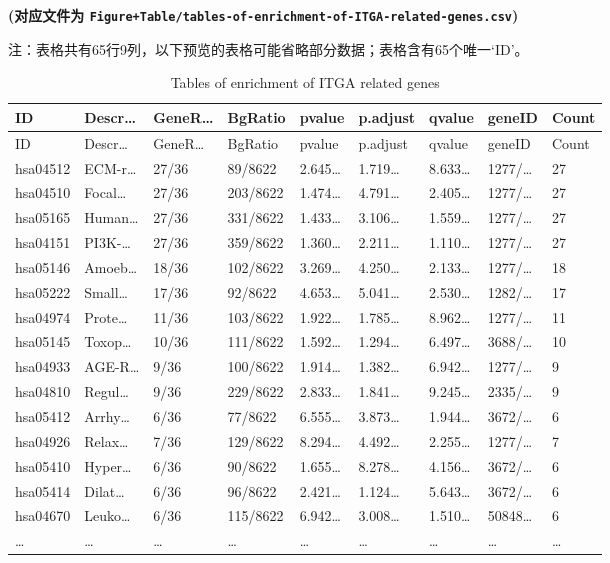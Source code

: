 \documentclass[
]{article}
\begin{document}
\textbf{(对应文件为 \texttt{Figure+Table/tables-of-enrichment-of-ITGA-related-genes.csv})}

\begin{center}\begin{tcolorbox}[colback=gray!10, colframe=gray!50, width=0.9\linewidth, arc=1mm, boxrule=0.5pt]注：表格共有65行9列，以下预览的表格可能省略部分数据；表格含有65个唯一`ID'。
\end{tcolorbox}
\end{center}

\begin{longtable}[]{@{}lllllllll@{}}
\caption{\label{tab:tables-of-enrichment-of-ITGA-related-genes}Tables of enrichment of ITGA related genes}\tabularnewline
\toprule
ID & Descr\ldots{} & GeneR\ldots{} & BgRatio & pvalue & p.adjust & qvalue & geneID & Count\tabularnewline
\midrule
\endfirsthead
\toprule
ID & Descr\ldots{} & GeneR\ldots{} & BgRatio & pvalue & p.adjust & qvalue & geneID & Count\tabularnewline
\midrule
\endhead
hsa04512 & ECM-r\ldots{} & 27/36 & 89/8622 & 2.645\ldots{} & 1.719\ldots{} & 8.633\ldots{} & 1277/\ldots{} & 27\tabularnewline
hsa04510 & Focal\ldots{} & 27/36 & 203/8622 & 1.474\ldots{} & 4.791\ldots{} & 2.405\ldots{} & 1277/\ldots{} & 27\tabularnewline
hsa05165 & Human\ldots{} & 27/36 & 331/8622 & 1.433\ldots{} & 3.106\ldots{} & 1.559\ldots{} & 1277/\ldots{} & 27\tabularnewline
hsa04151 & PI3K-\ldots{} & 27/36 & 359/8622 & 1.360\ldots{} & 2.211\ldots{} & 1.110\ldots{} & 1277/\ldots{} & 27\tabularnewline
hsa05146 & Amoeb\ldots{} & 18/36 & 102/8622 & 3.269\ldots{} & 4.250\ldots{} & 2.133\ldots{} & 1277/\ldots{} & 18\tabularnewline
hsa05222 & Small\ldots{} & 17/36 & 92/8622 & 4.653\ldots{} & 5.041\ldots{} & 2.530\ldots{} & 1282/\ldots{} & 17\tabularnewline
hsa04974 & Prote\ldots{} & 11/36 & 103/8622 & 1.922\ldots{} & 1.785\ldots{} & 8.962\ldots{} & 1277/\ldots{} & 11\tabularnewline
hsa05145 & Toxop\ldots{} & 10/36 & 111/8622 & 1.592\ldots{} & 1.294\ldots{} & 6.497\ldots{} & 3688/\ldots{} & 10\tabularnewline
hsa04933 & AGE-R\ldots{} & 9/36 & 100/8622 & 1.914\ldots{} & 1.382\ldots{} & 6.942\ldots{} & 1277/\ldots{} & 9\tabularnewline
hsa04810 & Regul\ldots{} & 9/36 & 229/8622 & 2.833\ldots{} & 1.841\ldots{} & 9.245\ldots{} & 2335/\ldots{} & 9\tabularnewline
hsa05412 & Arrhy\ldots{} & 6/36 & 77/8622 & 6.555\ldots{} & 3.873\ldots{} & 1.944\ldots{} & 3672/\ldots{} & 6\tabularnewline
hsa04926 & Relax\ldots{} & 7/36 & 129/8622 & 8.294\ldots{} & 4.492\ldots{} & 2.255\ldots{} & 1277/\ldots{} & 7\tabularnewline
hsa05410 & Hyper\ldots{} & 6/36 & 90/8622 & 1.655\ldots{} & 8.278\ldots{} & 4.156\ldots{} & 3672/\ldots{} & 6\tabularnewline
hsa05414 & Dilat\ldots{} & 6/36 & 96/8622 & 2.421\ldots{} & 1.124\ldots{} & 5.643\ldots{} & 3672/\ldots{} & 6\tabularnewline
hsa04670 & Leuko\ldots{} & 6/36 & 115/8622 & 6.942\ldots{} & 3.008\ldots{} & 1.510\ldots{} & 50848\ldots{} & 6\tabularnewline
\ldots{} & \ldots{} & \ldots{} & \ldots{} & \ldots{} & \ldots{} & \ldots{} & \ldots{} & \ldots{}\tabularnewline
\bottomrule
\end{longtable}
\end{document}
